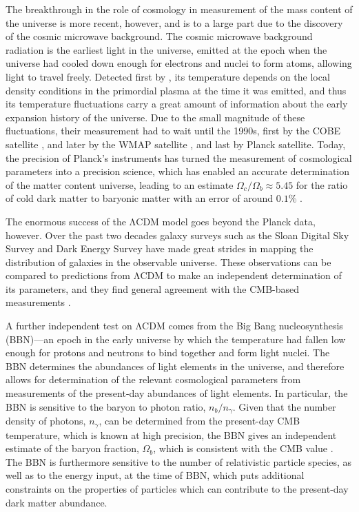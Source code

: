 The breakthrough in the role of cosmology in measurement of the mass content of the universe is more recent, however, and is to a large part due to the discovery of the cosmic microwave background. The cosmic microwave background radiation is the earliest light in the universe, emitted at the epoch when the universe had cooled down enough for electrons and nuclei to form atoms, allowing light to travel freely. Detected first by \textcite{PenziasWilson1965}, its temperature depends on the local density conditions in the primordial plasma at the time it was emitted, and thus its temperature fluctuations carry a great amount of information about the early expansion history of the universe. Due to the small magnitude of these fluctuations, their measurement had to wait until the 1990s, first by the COBE satellite \parencite{BennettEtAl1996}, and later by the WMAP satellite \parencite{BennettEtAl2013}, and last by Planck satellite. Today, the precision of Planck's instruments has turned the measurement of cosmological parameters into a precision science, which has enabled an accurate determination of the matter content universe, leading to an estimate $\Omega_c/\Omega_b\approx 5.45$ for the ratio of cold dark matter to baryonic matter with an error of around $0.1\%$ \parencite{Planck2018}.

The enormous success of the ΛCDM model goes beyond the Planck data, however. Over the past two decades galaxy surveys such as the Sloan Digital Sky Survey \parencite{SDSSIV2022} and Dark Energy Survey \parencite{DES2018} have made great strides in mapping the distribution of galaxies in the observable universe. These observations can be compared to predictions from ΛCDM to make an independent determination of its parameters, and they find general agreement with the CMB-based measurements \parencite{eBOSS2021}.

A further independent test on ΛCDM comes from the Big Bang nucleosynthesis (BBN)---an epoch in the early universe by which the temperature had fallen low enough for protons and neutrons to bind together and form light nuclei. The BBN determines the abundances of light elements in the universe, and therefore allows for determination of the relevant cosmological parameters from measurements of the present-day abundances of light elements. In particular, the BBN is sensitive to the baryon to photon ratio, $n_b/n_\gamma$. Given that the number density of photons, $n_\gamma$, can be determined from the present-day CMB temperature, which is known at high precision, the BBN gives an independent estimate of the baryon fraction, $\Omega_b$, which is consistent with the CMB value \parencite{FieldsEtAl2020}. The BBN is furthermore sensitive to the number of relativistic particle species, as well as to the energy input, at the time of BBN, which puts additional constraints on the properties of particles which can contribute to the present-day dark matter abundance.

